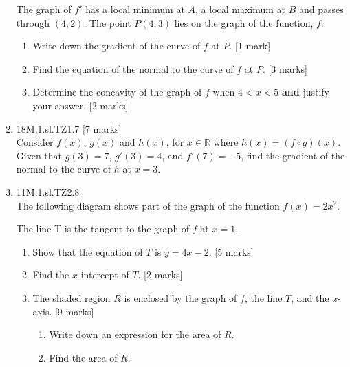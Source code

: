 \documentclass[12pt, twoside]{article}
\begin{document}
\begin{enumerate}
    The graph of $f'$ has a local minimum at $A$, a local maximum at $B$ and passes through $(4,2)$. The point $P(4,3)$ lies on the graph of the function, $f$.
    \begin{enumerate}
      \item Write down the gradient of the curve of $f$ at $P$. [1 mark]
      \item Find the equation of the normal to the curve of $f$ at $P$. [3 marks]
      \item Determine the concavity of the graph of $f$ when $4<x<5$ \textbf{and} justify your answer. [2 marks]
    \end{enumerate}

  \item 18M.1.sl.TZ1.7 [7 marks]\\
  Consider $f(x)$, $g(x)$ and $h(x)$, for $x \in \mathbb{R}$ where $h(x)=(f \circ g)(x)$.\\
  Given that $g(3)=7$, $g'(3)=4$, and $f'(7)=-5$, find the gradient of the normal to the curve of $h$ at $x=3$.


  \item 11M.1.sl.TZ2.8\\
  The following diagram shows part of the graph of the function $f(x)=2x^2$.
    \begin{center}
    \end{center}

    The line T is the tangent to the graph of $f$ at $x=1$.
    \begin{enumerate}
      \item Show that the equation of $T$ is $y=4x-2$. [5 marks]
      \item Find the $x$-intercept of $T$. [2 marks]
      \item The shaded region $R$ is enclosed by the graph of $f$, the line $T$, and the $x$-axis. [9 marks]
      \begin{enumerate}
        \item Write down an expression for the area of $R$.
        \item Find the area of $R$.
      \end{enumerate}
    \end{enumerate}



\end{enumerate}
\end{document}
